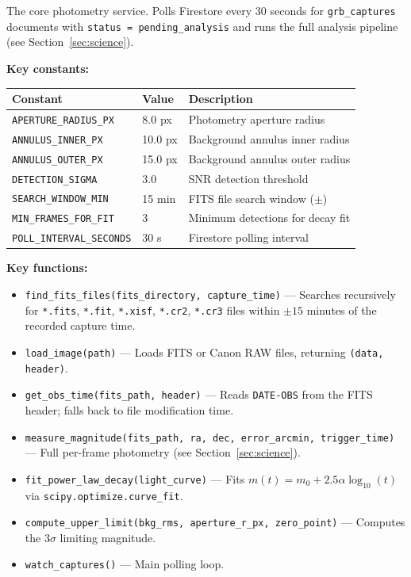 \documentclass[12pt,a4paper]{article}
\begin{document}
The core photometry service. Polls Firestore every 30 seconds for
\texttt{grb\_captures} documents with \texttt{status = pending\_analysis}
and runs the full analysis pipeline (see Section~\ref{sec:science}).

\textbf{Key constants:}

\begin{center}
\begin{tabular}{lll}
\toprule
Constant & Value & Description \\
\midrule
\texttt{APERTURE\_RADIUS\_PX} & 8.0 px & Photometry aperture radius \\
\texttt{ANNULUS\_INNER\_PX}   & 10.0 px & Background annulus inner radius \\
\texttt{ANNULUS\_OUTER\_PX}   & 15.0 px & Background annulus outer radius \\
\texttt{DETECTION\_SIGMA}     & 3.0 & SNR detection threshold \\
\texttt{SEARCH\_WINDOW\_MIN}  & 15 min & FITS file search window ($\pm$) \\
\texttt{MIN\_FRAMES\_FOR\_FIT}& 3 & Minimum detections for decay fit \\
\texttt{POLL\_INTERVAL\_SECONDS} & 30 s & Firestore polling interval \\
\bottomrule
\end{tabular}
\end{center}

\textbf{Key functions:}

\begin{itemize}
    \item \texttt{find\_fits\_files(fits\_directory, capture\_time)} ---
          Searches recursively for \texttt{*.fits}, \texttt{*.fit},
          \texttt{*.xisf}, \texttt{*.cr2}, \texttt{*.cr3} files within
          $\pm15$ minutes of the recorded capture time.
    \item \texttt{load\_image(path)} --- Loads FITS or Canon RAW files,
          returning \texttt{(data, header)}.
    \item \texttt{get\_obs\_time(fits\_path, header)} --- Reads
          \texttt{DATE-OBS} from the FITS header; falls back to file
          modification time.
    \item \texttt{measure\_magnitude(fits\_path, ra, dec, error\_arcmin,
          trigger\_time)} --- Full per-frame photometry (see
          Section~\ref{sec:science}).
    \item \texttt{fit\_power\_law\_decay(light\_curve)} --- Fits
          $m(t) = m_0 + 2.5\alpha\log_{10}(t)$ via
          \texttt{scipy.optimize.curve\_fit}.
    \item \texttt{compute\_upper\_limit(bkg\_rms, aperture\_r\_px,
          zero\_point)} --- Computes the 3$\sigma$ limiting magnitude.
    \item \texttt{watch\_captures()} --- Main polling loop.
\end{itemize}
\end{document}
